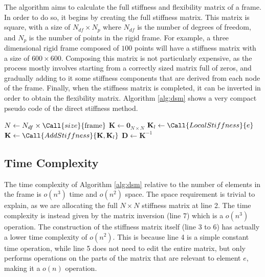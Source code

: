 The algorithm aims to calculate the full stiffness and flexibility matrix of a frame.
In order to do so, it begins by creating the full stiffness matrix. This matrix is square,
with a size of $N_{df} \times N_p$ where $N_{df}$ is the number
of degrees of freedom, and $N_p$ is the number of points in the rigid frame.
For example, a three dimensional rigid frame composed of $100$ points will have
a stiffness matrix with a size of $600 \times 600$.
Composing this matrix is not particularly expensive, as the process 
mostly involves starting from a correctly sized matrix full of zeros, and gradually
adding to it some stiffness components that are derived from each node of the frame.
Finally, when the stiffness matrix is completed, it can be inverted in order to obtain the
flexibility matrix.
Algorithm \ref{alg:dsm} shows a very compact pseudo code of the direct stiffness method.


\begin{algorithm}
\caption{Direct Stiffness Method}
\label{alg:dsm}
\begin{algorithmic}[1] %
    \State $N \gets N_{df} \times \Call{size}{\text{frame}}$ 
    \State $\mathbf{K} \gets \mathbf{0}_{N \times N}$ 
     
        \State $\mathbf{K}_l \gets \Call{LocalStiffness}{e}$ 
        \State $\mathbf{K} \gets \Call{AddStiffness}{\mathbf{K}, \mathbf{K}_l}$ 
    \EndFor
    \State $\mathbf{D} \gets \mathbf{K}^{-1}$ 
\end{algorithmic}
\end{algorithm}


\subsection{Time Complexity}

The time complexity of Algorithm \ref{alg:dsm} relative to the number of elements in
the frame is $o(n^3)$ time and $o(n^2)$ space.
The space requirement is trivial to explain, as we are allocating the full $N \times N$
stiffness matrix at line 2.
The time complexity is instead given by the matrix inversion (line 7) which is a $o(n^3)$
operation.
The construction of the stiffness matrix itself (line 3 to 6) has actually a lower time complexity
of $o(n^2)$. This is because line 4 is a simple constant time operation, while line 5
does not need to edit the entire matrix, but only performs operations on the parts of the matrix
that are relevant to element $e$, making it a $o(n)$ operation.




